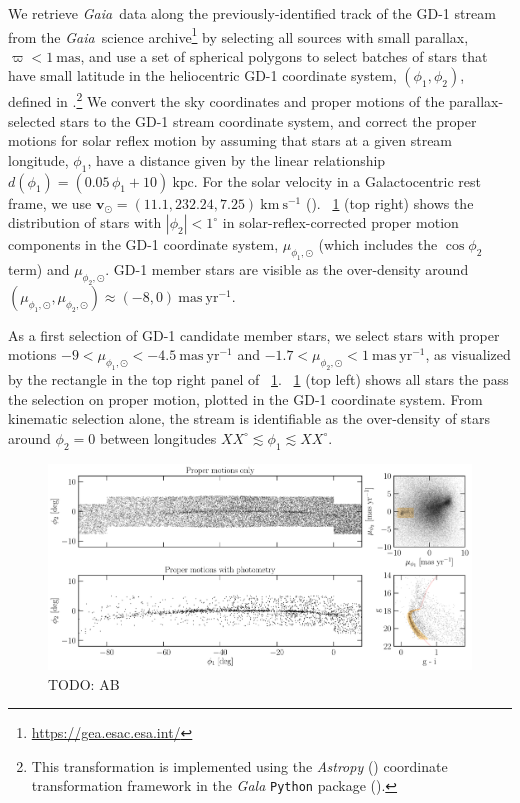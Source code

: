 \documentclass[modern]{aastex62}
\newcommand{\package}[1]{\textsl{#1}}
\newcommand{\gaia}{\textsl{Gaia}}
\newcommand{\kms}{\ensuremath{\textrm{km}~\textrm{s}^{-1}}}
\newcommand{\bs}[1]{\boldsymbol{#1}}
\newcommand{\masyr}{\ensuremath{\textrm{mas}~\textrm{yr}^{-1}}}
\newcommand{\todo}[1]{{\color{red} TODO: #1}}
\begin{document}
We retrieve \gaia\ data along the previously-identified track of the GD-1 stream
from the \gaia\ science archive\footnote{\url{https://gea.esac.esa.int/}} by
selecting all sources with small parallax, $\varpi < 1~\textrm{mas}$, and use a
set of spherical polygons to select batches of stars that have small latitude in
the heliocentric GD-1 coordinate system, $(\phi_1, \phi_2)$, defined in
\cite{Koposov:2010}.\footnote{This transformation is implemented using the
\package{Astropy} (\citealt{astropy}) coordinate transformation framework in the
\package{Gala} \texttt{Python} package (\citealt{gala}).}
We convert the sky coordinates and proper motions of the parallax-selected stars
to the GD-1 stream coordinate system, and correct the proper motions for solar
reflex motion by assuming that stars at a given stream longitude, $\phi_1$, have
a distance given by the linear relationship $d(\phi_1) = (0.05 \, \phi_1 +
10)~\textrm{kpc}$.
For the solar velocity in a Galactocentric rest frame, we use $\bs{v}_\odot =
(11.1, 232.24, 7.25)~\kms$ (\citealt{Schonrich:2010, Bovy:2015}).
\figurename~\ref{fig:selection} (top right) shows the distribution of stars with
$|\phi_2| < 1^\circ$ in solar-reflex-corrected proper motion components in the
GD-1 coordinate system, $\mu_{\phi_1, \odot}$ (which includes the $\cos{\phi_2}$
term) and $\mu_{\phi_2, \odot}$.
GD-1 member stars are visible as the over-density around
$(\mu_{\phi_1, \odot}, \mu_{\phi_2, \odot}) \approx (-8, 0)~\masyr$.

As a first selection of GD-1 candidate member stars, we select stars with proper
motions $-9 < \mu_{\phi_1, \odot} < -4.5~\masyr$ and $-1.7 < \mu_{\phi_2, \odot}
< 1~\masyr$, as visualized by the rectangle in the top right panel of
\figurename~\ref{fig:selection}.
\figurename~\ref{fig:selection} (top left) shows all stars the pass the
selection on proper motion, plotted in the GD-1 coordinate system.
From kinematic selection alone, the stream is identifiable as the over-density
of stars around $\phi_2 = 0$ between longitudes $XX^\circ \lesssim \phi_1
\lesssim XX^\circ$.

\begin{figure}[h]
\begin{center}
\includegraphics[width=\textwidth]{gd1_sample.pdf}
\end{center}
\caption{
    \todo{AB}
\label{fig:selection}
}
\end{figure}
\end{document}
